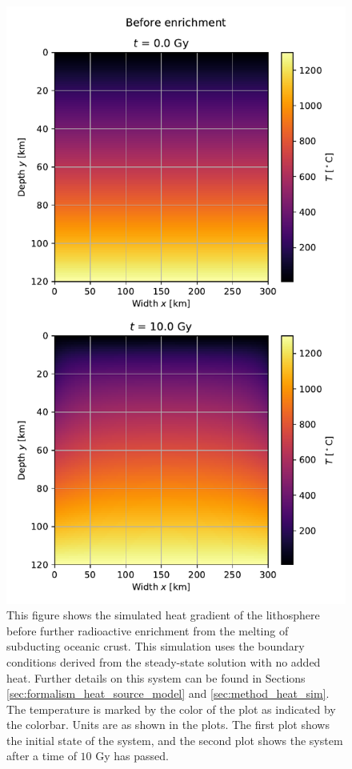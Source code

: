 \documentclass[reprint,english,notitlepage]{revtex4-1}  %
\begin{document}
\begin{figure}[H]
\centering
\includegraphics[width=\columnwidth]{../data/2D_first_heat_before.pdf}
\caption{This figure shows the simulated heat gradient of the lithosphere before further radioactive enrichment from the melting of subducting oceanic crust. This simulation uses the boundary conditions derived from the steady-state solution with no added heat. Further details on this system can be found in Sections \ref{sec:formalism_heat_source_model} and \ref{sec:method_heat_sim}. The temperature is marked by the color of the plot as indicated by the colorbar. Units are as shown in the plots. The first plot shows the initial state of the system, and the second plot shows the system after a time of $10$ Gy has passed. } \label{fig:lithosphere_steady_state_project}
\end{figure}
\end{document}
